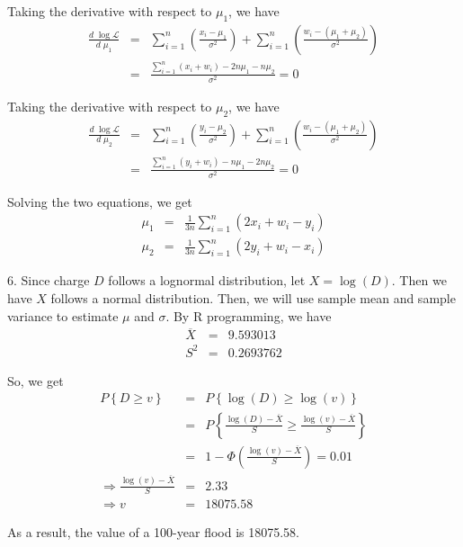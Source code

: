 \documentclass[12pt]{article}
\begin{document}
Taking the derivative with respect to $\mu_1$, we have
\begin{eqnarray*}
  \frac {d \; \log {\mathcal{L}}}{d \; \mu_1}
  &=& \sum_{i=1}^n \left( \frac{x_i - \mu_1}{\sigma^2} \right) +
  \sum_{i=1}^n \left( \frac{w_i - (\mu_1+\mu_2)}{\sigma^2} \right) \\
  &=& \frac {\sum_{i=1}^n (x_i + w_i) - 2n \mu_1 - n \mu_2}{\sigma^2} = 0
\end{eqnarray*}

Taking the derivative with respect to $\mu_2$, we have
\begin{eqnarray*}
  \frac {d \; \log {\mathcal{L}}}{d \; \mu_2}
  &=& \sum_{i=1}^n \left( \frac{y_i - \mu_2}{\sigma^2} \right) +
  \sum_{i=1}^n \left( \frac{w_i - (\mu_1+\mu_2)}{\sigma^2} \right) \\
  &=& \frac {\sum_{i=1}^n (y_i + w_i) - n \mu_1 - 2n \mu_2}{\sigma^2} = 0
\end{eqnarray*}

Solving the two equations, we get
\begin{eqnarray*}
  \mu_1 &=& \frac {1}{3n} \sum_{i=1}^n (2x_i + w_i - y_i) \\
  \mu_2 &=& \frac {1}{3n} \sum_{i=1}^n (2y_i + w_i - x_i)
\end{eqnarray*}

6. Since charge $D$ follows a lognormal distribution, let $X = \log (D)$. Then we have $X$ follows a normal distribution. Then, we will use sample mean and sample variance to estimate $\mu$ and $\sigma$. By R programming, we have
\begin{eqnarray*}
  \overline{X} &=& 9.593013 \\
  S^2 &=& 0.2693762
\end{eqnarray*}

So, we get
\begin{eqnarray*}
  P \left\{ D \ge v \right\}
  &=& P \left\{ \log (D) \ge \log (v) \right\} \\
  &=& P \left\{ \frac {\log (D) - \overline{X}}{S}
    \ge \frac {\log (v) - \overline{X}}{S} \right\} \\
  &=& 1 - \Phi \left( \frac {\log (v) - \overline{X}}{S} \right) = 0.01 \\
  \Rightarrow \frac {\log (v) - \overline{X}}{S} &=& 2.33 \\
  \Rightarrow v &=& 18075.58
\end{eqnarray*}

As a result, the value of a 100-year flood is 18075.58. \\
\end{document}
